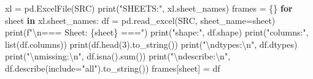 \documentclass[
]{ctexart}
\newenvironment{Shaded}{\begin{snugshade}}{\end{snugshade}}
\newcommand{\BuiltInTok}[1]{\textcolor[rgb]{0.00,0.23,0.31}{#1}}
\newcommand{\CharTok}[1]{\textcolor[rgb]{0.13,0.47,0.30}{#1}}
\newcommand{\ControlFlowTok}[1]{\textcolor[rgb]{0.00,0.23,0.31}{\textbf{#1}}}
\newcommand{\DecValTok}[1]{\textcolor[rgb]{0.68,0.00,0.00}{#1}}
\newcommand{\KeywordTok}[1]{\textcolor[rgb]{0.00,0.23,0.31}{\textbf{#1}}}
\newcommand{\NormalTok}[1]{\textcolor[rgb]{0.00,0.23,0.31}{#1}}
\newcommand{\OperatorTok}[1]{\textcolor[rgb]{0.37,0.37,0.37}{#1}}
\newcommand{\SpecialCharTok}[1]{\textcolor[rgb]{0.37,0.37,0.37}{#1}}
\newcommand{\SpecialStringTok}[1]{\textcolor[rgb]{0.13,0.47,0.30}{#1}}
\newcommand{\StringTok}[1]{\textcolor[rgb]{0.13,0.47,0.30}{#1}}
\begin{document}
\begin{Shaded}
\begin{Highlighting}[]
\NormalTok{xl }\OperatorTok{=}\NormalTok{ pd.ExcelFile(SRC)}
\BuiltInTok{print}\NormalTok{(}\StringTok{"SHEETS:"}\NormalTok{, xl.sheet\_names)}
\NormalTok{frames }\OperatorTok{=}\NormalTok{ \{\}}
\ControlFlowTok{for}\NormalTok{ sheet }\KeywordTok{in}\NormalTok{ xl.sheet\_names:}
\NormalTok{    df }\OperatorTok{=}\NormalTok{ pd.read\_excel(SRC, sheet\_name}\OperatorTok{=}\NormalTok{sheet)}
    \BuiltInTok{print}\NormalTok{(}\SpecialStringTok{f"}\CharTok{\textbackslash{}n}\SpecialStringTok{=== Sheet: }\SpecialCharTok{\{}\NormalTok{sheet}\SpecialCharTok{\}}\SpecialStringTok{ ==="}\NormalTok{)}
    \BuiltInTok{print}\NormalTok{(}\StringTok{"shape:"}\NormalTok{, df.shape)}
    \BuiltInTok{print}\NormalTok{(}\StringTok{"columns:"}\NormalTok{, }\BuiltInTok{list}\NormalTok{(df.columns))}
    \BuiltInTok{print}\NormalTok{(df.head(}\DecValTok{3}\NormalTok{).to\_string())}
    \BuiltInTok{print}\NormalTok{(}\StringTok{"}\CharTok{\textbackslash{}n}\StringTok{dtypes:}\CharTok{\textbackslash{}n}\StringTok{"}\NormalTok{, df.dtypes)}
    \BuiltInTok{print}\NormalTok{(}\StringTok{"}\CharTok{\textbackslash{}n}\StringTok{missing:}\CharTok{\textbackslash{}n}\StringTok{"}\NormalTok{, df.isna().}\BuiltInTok{sum}\NormalTok{())}
    \BuiltInTok{print}\NormalTok{(}\StringTok{"}\CharTok{\textbackslash{}n}\StringTok{describe:}\CharTok{\textbackslash{}n}\StringTok{"}\NormalTok{, df.describe(include}\OperatorTok{=}\StringTok{"all"}\NormalTok{).to\_string())}
\NormalTok{    frames[sheet] }\OperatorTok{=}\NormalTok{ df}



\end{Highlighting}
\end{Shaded}
\end{document}
